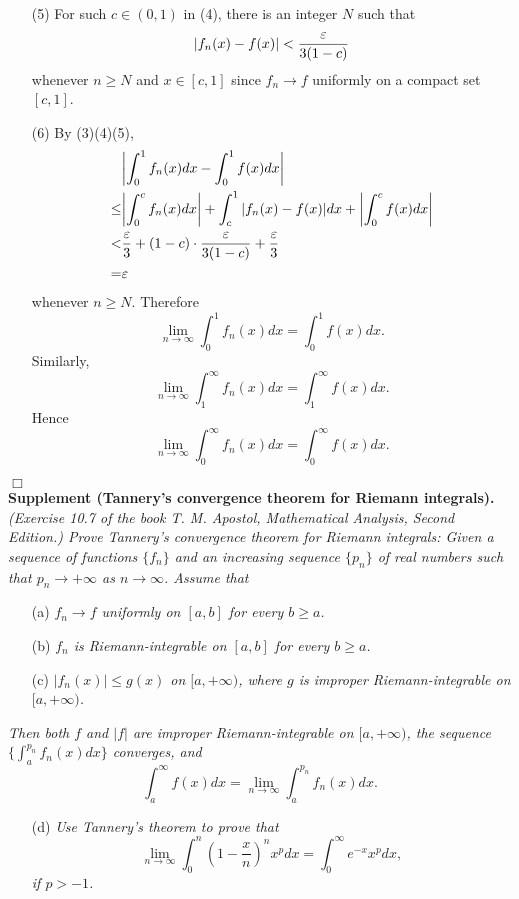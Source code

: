 \documentclass{article}
\begin{document}
\begin{enumerate}
\item[(5)]
For such $c \in (0,1)$ in (4), there is an integer $N$ such that
\[
  \abs{f_n(x) - f(x)} < \frac{\varepsilon}{3(1-c)}
\]
whenever $n \geq N$ and $x \in [c,1]$
since $f_n \to f$ uniformly on a compact set $[c,1]$.

\item[(6)]
By (3)(4)(5),
\begin{align*}
  &\abs{ \int_{0}^{1} f_n(x)dx - \int_{0}^{1} f(x)dx } \\
  \leq&
  \abs{ \int_{0}^{c} f_n(x)dx }
    + \int_{c}^{1} \abs{ f_n(x) - f(x) } dx
    + \abs{ \int_{0}^{c} f(x)dx } \\
  <&
  \frac{\varepsilon}{3}
    + (1-c) \cdot \frac{\varepsilon}{3(1-c)}
    + \frac{\varepsilon}{3} \\
  =&
  \varepsilon
\end{align*}
whenever $n \geq N$.
Therefore
\[
  \lim_{n \to \infty} \int_{0}^{1} f_n(x)dx = \int_{0}^{1} f(x)dx.
\]
Similarly,
\[
  \lim_{n \to \infty} \int_{1}^{\infty} f_n(x)dx = \int_{1}^{\infty} f(x)dx.
\]
Hence
\[
  \lim_{n \to \infty} \int_{0}^{\infty} f_n(x)dx = \int_{0}^{\infty} f(x)dx.
\]
\end{enumerate}
$\Box$ \\



\textbf{Supplement (Tannery's convergence theorem for Riemann integrals).}
\emph{(Exercise 10.7 of the book
T. M. Apostol, Mathematical Analysis, Second Edition.)
Prove Tannery's convergence theorem for Riemann integrals:
Given a sequence of functions $\{f_n\}$ and an increasing sequence $\{p_n\}$
of real numbers such that $p_n \to +\infty$ as $n \to \infty$.
Assume that}
\begin{enumerate}
\item[(a)]
\emph{$f_n \to f$ uniformly on $[a,b]$ for every $b \geq a$.}

\item[(b)]
\emph{$f_n$ is Riemann-integrable on $[a,b]$ for every $b \geq a$.}

\item[(c)]
\emph{$|f_n(x)| \leq g(x)$ on $[a,+\infty)$,
where $g$ is improper Riemann-integrable on $[a,+\infty)$.}
\end{enumerate}

\emph{Then both $f$ and $|f|$ are improper Riemann-integrable on $[a,+\infty)$,
the sequence $\{\int_{a}^{p_n}f_n(x)dx\}$ converges, and
\[
  \int_{a}^{\infty} f(x)dx = \lim_{n \to \infty}\int_{a}^{p_n}f_n(x)dx.
\]}
\begin{enumerate}
\item[(d)]
\emph{Use Tannery's theorem to prove that
\[
  \lim_{n \to \infty} \int_{0}^{n} \left( 1-\frac{x}{n} \right)^n x^p dx
  = \int_{0}^{\infty} e^{-x}x^p dx,
\]
if $p > -1$.} \\\\
\end{enumerate}
\end{document}
